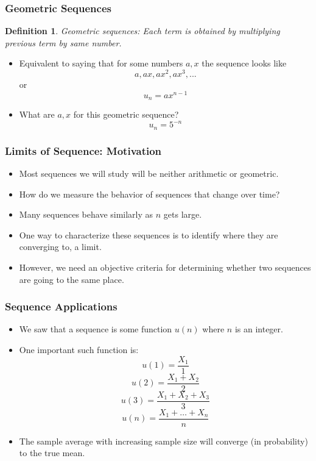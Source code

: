 \documentclass{beamer}
\newtheorem{defn}{Definition}
\numberwithin{equation}{section}
\begin{document}
\begin{frame}
\frametitle{Geometric Sequences}

\begin{defn}
Geometric sequences: Each term is obtained by multiplying previous term by same number.
\end{defn} \pause

\begin{itemize}
\item Equivalent to saying that for some numbers $a, x$ the sequence looks like $$a, ax, ax^2, ax^3, ...$$ or $$u_n=ax^{n-1}$$ \pause
\item What are $a, x$ for this geometric sequence? $$u_n=5^{-n}$$ 
\end{itemize}

\end{frame}



\begin{frame}
\frametitle{Limits of Sequence: Motivation}

\begin{itemize}
\item Most sequences we will study will be neither arithmetic or geometric.\pause
\item How do we measure the behavior of sequences that change over time?   \pause
\item Many sequences behave similarly as $n$ gets large.
\item One way to characterize these sequences is to identify where they are converging to, a limit.
\item However, we need an objective criteria for determining whether two sequences are going to the same place.
\end{itemize}

\end{frame}




\begin{frame}
\frametitle{Sequence Applications}

\begin{itemize}
\item We saw that a sequence is some function $u(n)$ where $n$ is an integer.\pause
\item One important such function is:
$$u(1)=\frac{X_1}{1}$$\pause
$$u(2)=\frac{X_1+X_2}{2}$$\pause
$$u(3)=\frac{X_1+X_2+X_3}{3}$$\pause
$$u(n)=\frac{X_1+\ldots+X_n}{n}$$\pause

\item The sample average with increasing sample size will converge (in probability) to the true mean.
\end{itemize}

\end{frame}
\end{document}
